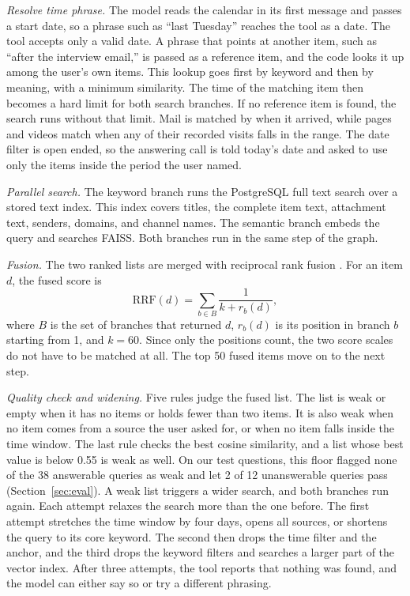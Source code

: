 \documentclass[conference]{IEEEtran}
\begin{document}
\textit{Resolve time phrase.} The model reads the calendar in its first message and passes a start date, so a phrase such as ``last Tuesday'' reaches the tool as a date. The tool accepts only a valid date. A phrase that points at another item, such as ``after the interview email,'' is passed as a reference item, and the code looks it up among the user's own items. This lookup goes first by keyword and then by meaning, with a minimum similarity. The time of the matching item then becomes a hard limit for both search branches. If no reference item is found, the search runs without that limit. Mail is matched by when it arrived, while pages and videos match when any of their recorded visits falls in the range. The date filter is open ended, so the answering call is told today's date and asked to use only the items inside the period the user named.

\textit{Parallel search.} The keyword branch runs the PostgreSQL full text search over a stored text index. This index covers titles, the complete item text, attachment text, senders, domains, and channel names. The semantic branch embeds the query and searches FAISS. Both branches run in the same step of the graph.

\textit{Fusion.} The two ranked lists are merged with reciprocal rank fusion \cite{b9}. For an item $d$, the fused score is
\begin{equation}
\mathrm{RRF}(d) = \sum_{b \in B} \frac{1}{k + r_b(d)}, \label{eq:rrf}
\end{equation}
where $B$ is the set of branches that returned $d$, $r_b(d)$ is its position in branch $b$ starting from 1, and $k = 60$. Since only the positions count, the two score scales do not have to be matched at all. The top 50 fused items move on to the next step.

\textit{Quality check and widening.} Five rules judge the fused list. The list is weak or empty when it has no items or holds fewer than two items. It is also weak when no item comes from a source the user asked for, or when no item falls inside the time window. The last rule checks the best cosine similarity, and a list whose best value is below 0.55 is weak as well. On our test questions, this floor flagged none of the 38 answerable queries as weak and let 2 of 12 unanswerable queries pass (Section~\ref{sec:eval}). A weak list triggers a wider search, and both branches run again. Each attempt relaxes the search more than the one before. The first attempt stretches the time window by four days, opens all sources, or shortens the query to its core keyword. The second then drops the time filter and the anchor, and the third drops the keyword filters and searches a larger part of the vector index. After three attempts, the tool reports that nothing was found, and the model can either say so or try a different phrasing.
\end{document}
